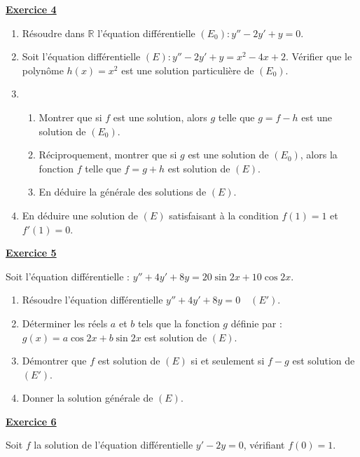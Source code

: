 \documentclass[12pt,a4paper]{article}
\newcommand{\exo}[1]{%
        \textbf{\underline{Exercice #1}}
}
\begin{document}
\begin{multicols}{2}
\vspace{1em}

\exo{4}
\begin{enumerate}
    \item Résoudre dans \( \mathbb{R} \) l’équation différentielle \( (E_0) : y'' - 2y' + y = 0 \).
    \item Soit l’équation différentielle \( (E) : y'' - 2y' + y = x^2 - 4x + 2 \). Vérifier que le polynôme \( h(x) = x^2 \) est une solution particulière de \( (E_0) \).
    \item
    \begin{enumerate}
        \item Montrer que si \( f \) est une solution, alors \( g \) telle que \( g = f - h \) est une solution de \( (E_0) \).
    
        \item Réciproquement, montrer que si \( g \) est une solution de \( (E_0) \), alors la fonction \( f \) telle que \( f = g + h \) est solution de \( (E) \).
    
        \item En déduire la générale des solutions de \( (E) \).
    \end{enumerate}
    \item En déduire une solution de \( (E) \) satisfaisant à la condition \( f(1) = 1 \) et \( f'(1) = 0 \).
\end{enumerate}


\vspace{1em}

\exo{5}

Soit l’équation différentielle : \(y'' + 4y' + 8y = 20 \sin 2x + 10 \cos 2x.\)

\begin{enumerate}
    \item Résoudre l’équation différentielle  \( y'' + 4y' + 8y = 0 \quad (E').\)
    
    \item Déterminer les réels \( a \) et \( b \) tels que la fonction \( g \) définie par : \(    g(x) = a \cos 2x + b \sin 2x\)
    est solution de \( (E) \).
    
    \item Démontrer que \( f \) est solution de \( (E) \) si et seulement si \( f - g \) est solution de \( (E') \).
    \item Donner la solution générale de \( (E) \).
\end{enumerate}
\exo{6}
Soit \( f \) la solution de l’équation différentielle \( y' - 2y = 0 \), vérifiant \( f(0) = 1 \).


\end{multicols}
\end{document}
